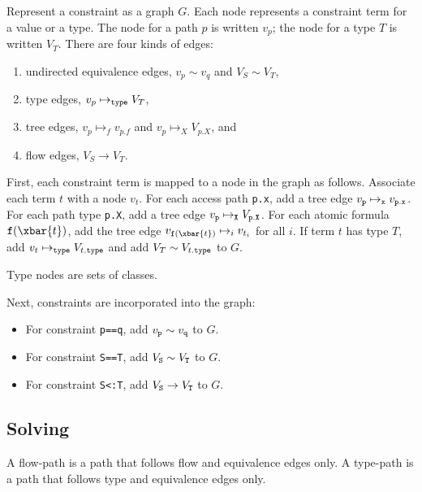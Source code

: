 \newcommand\eqedge{\sim}
\newcommand\flowedge{\to}
\newcommand\treeedge[1]{\mapsto_{#1}}
\newcommand\typeedge{\mapsto_{\tt type}}

Represent a constraint as a graph $G$.
Each node represents a constraint term for a value or a type.
The node for a path $p$ is written $v_p$;
the node for a type $T$ is written $V_T$.
There are four kinds of edges:
\begin{enumerate}
\item undirected equivalence edges,
        $v_p \eqedge v_q$ and $V_S \eqedge V_T$,
\item type edges, $v_p \typeedge V_T$,
\item tree edges, $v_p \treeedge{f} v_{p.f}$
              and $v_p \treeedge{X} V_{p.X}$, and
\item flow edges, $V_S \flowedge V_T$.
\end{enumerate}

First, each constraint term is mapped to a node in the graph as
follows.
Associate each term $t$ with a node
$v_t$.  For each access path {\tt p.x}, add a tree edge
$v_{{\tt p}} \treeedge{{\tt x}} v_{{\tt p.x}}$.
For each path type {\tt p.X}, add a tree edge
$v_{{\tt p}} \treeedge{{\tt X}} V_{{\tt p.X}}$.
For each atomic formula ${\tt f}(\xbar{t})$, add the tree edge
$v_{{\tt f}(\xbar{t})} \treeedge{i} v_{t_i}$ for all $i$.
If term $t$ has type $T$, add $v_t \typeedge V_{t{\tt .type}}$
and
add $V_T \eqedge V_{t{\tt .type}}$ to $G$.

Type nodes are sets of classes.

Next, constraints are incorporated into the graph:

\begin{itemize}
\item
For constraint {\tt p==q}, add $v_{\tt p} \eqedge v_{\tt q}$ to $G$.

\item
For constraint {\tt S==T}, add $V_{\tt S} \eqedge V_{\tt T}$ to $G$.

\item
For constraint {\tt S<:T},
add $V_{\tt S} \flowedge V_{\tt T}$
to $G$.

\end{itemize}

\subsection{Solving}

A flow-path is a path that follows flow and equivalence edges
only.
A type-path is a path that follows type and equivalence edges
only.


